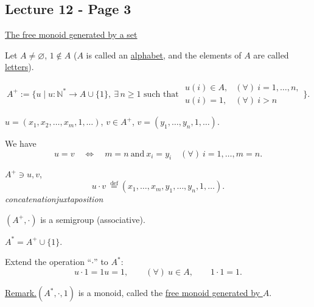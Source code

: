 
\subsection*{Lecture 12 - Page 3}

\noindent\underline{The free monoid generated by a set}

\bigskip
\noindent Let $A\neq\varnothing$, $1\notin A$ ($A$ is called an \underline{alphabet},
 and the elements of $A$ are called \underline{letters}).

\bigskip
\noindent
\[
A^{+}:=\bigl\{u\mid u:\mathbb{N}^{*}\longrightarrow A\cup\{1\},\ \exists\, n\geq 1
\text{ such that }
\begin{array}{ll}
 u(i)\in A, & (\forall)\ i=1,\ldots,n,\\
 u(i)=1, & (\forall)\ i>n
\end{array}
\bigr\}.
\]

\noindent $u=(x_1,x_2,\ldots,x_m,1,\ldots)$,
\qquad $v\in A^{+}$, $v=(y_1,\ldots,y_n,1,\ldots)$.

\medskip
\noindent We have
\[
u=v\quad\Longleftrightarrow\quad m=n\ \text{and}\ x_i=y_i
\quad(\forall)\ i=1,\ldots,m=n.
\]

\bigskip
\noindent $A^{+}\ni u,v$,
\[
u\cdot v\ \overset{\mathrm{def}}{=}
(x_1,\ldots,x_m,y_1,\ldots,y_n,1,\ldots).
\]
\noindent\hspace*{3em}\textit{concatenation}\hspace{5em}\textit{juxtaposition}

\bigskip
\noindent $(A^{+},\cdot)$ is a semigroup (associative).

\bigskip
\noindent $A^{*}=A^{+}\cup\{1\}$.

\noindent Extend the operation ``$\cdot$'' to $A^{*}$:
\[
u\cdot 1=1u=1,\qquad (\forall)\ u\in A, \qquad 1\cdot 1=1.
\]

\bigskip
\noindent\underline{Remark.}\quad $(A^{*},\cdot,1)$ is a monoid,
called the \underline{free monoid generated by $A$}.

